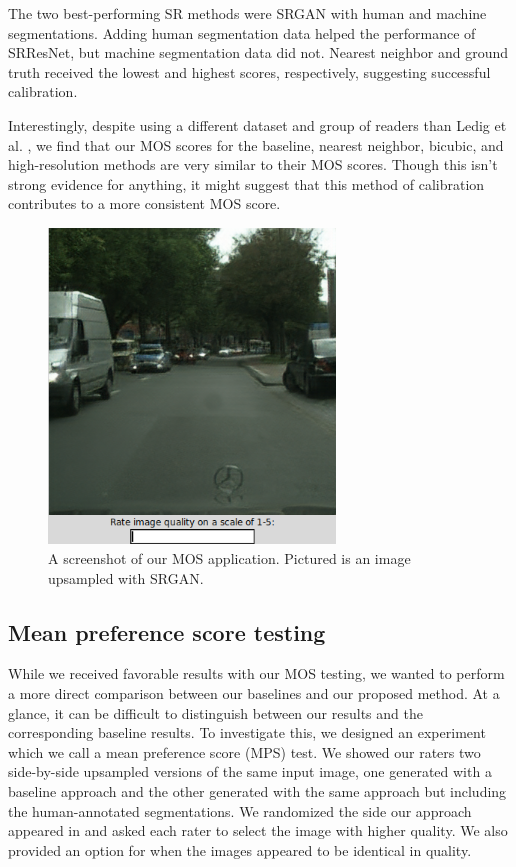 \documentclass[10pt,twocolumn,letterpaper]{article}
\begin{document}
The two best-performing SR methods were SRGAN with human and machine
segmentations. Adding human segmentation data helped the performance of
SRResNet, but machine segmentation data did not. Nearest neighbor and ground
truth received the lowest and highest scores, respectively, suggesting
successful calibration.

Interestingly, despite using a different dataset and group of readers than
Ledig et al. \cite{SRGAN}, we find that our MOS scores for the baseline,
nearest neighbor, bicubic, and high-resolution methods are very similar to
their MOS scores. Though this isn't strong evidence for anything, it might
suggest that this method of calibration contributes to a more consistent MOS
score.

\begin{figure}
    \begin{center}
        \includegraphics[trim=0 0 0 0, clip,
            width=3in]{images/mos.png}
    \end{center}
    \caption{A screenshot of our MOS application. Pictured is an image upsampled with SRGAN.}
\end{figure}

\subsection{Mean preference score testing}
While we received favorable results with our MOS testing, we wanted to perform
a more direct comparison between our baselines and our proposed method. At a
glance, it can be difficult to distinguish between our results and the
corresponding baseline results. To investigate this, we designed an experiment
which we call a mean preference score (MPS) test. We showed our raters two
side-by-side upsampled versions of the same input image, one generated with a
baseline approach and the other generated with the same approach but including
the human-annotated segmentations. We randomized the side our approach appeared
in and asked each rater to select the image with higher quality. We also
provided an option for when the images appeared to be identical in quality.
\end{document}
